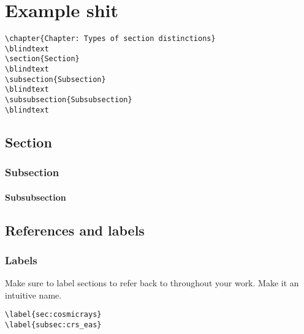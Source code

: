 
\acresetall %


\chapter{Example shit}


\begin{lstlisting}
\chapter{Chapter: Types of section distinctions}
\blindtext
\section{Section} 
\blindtext
\subsection{Subsection}
\blindtext
\subsubsection{Subsubsection}
\blindtext
\end{lstlisting}
\blindtext
\section{Section} 
\blindtext
\subsection{Subsection}
\blindtext
\subsubsection{Subsubsection}
\blindtext



\section{References and labels}



\subsection{Labels}


Make sure to label sections to refer back to throughout your work. Make it an intuitive name.
%
\begin{lstlisting}
\label{sec:cosmicrays}
\label{subsec:crs_eas}
\end{lstlisting}



